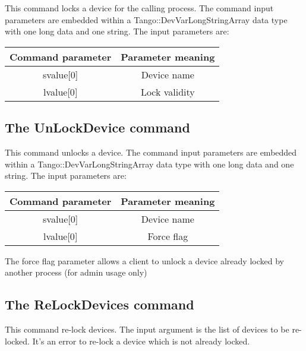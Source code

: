 This command locks a device for the calling process. The command input
parameters are embedded within a Tango::DevVarLongStringArray data
type with one long data and one string. The input parameters are:\vspace{0.3cm}


\begin{center}
\begin{longtable}{|c|c|}
\hline 
Command parameter & Parameter meaning\tabularnewline
\hline 
\hline 
svalue{[}0{]} & Device name\tabularnewline
\hline 
lvalue{[}0{]} & Lock validity\tabularnewline
\hline 
\end{longtable}
\par\end{center}

\vspace{0.3cm}



\subsection{The UnLockDevice command}

This command unlocks a device. The command input parameters are embedded
within a Tango::DevVarLongStringArray data type with one long data
and one string. The input parameters are:\vspace{0.3cm}


\begin{center}
\begin{longtable}{|c|c|}
\hline 
Command parameter & Parameter meaning\tabularnewline
\hline 
\hline 
svalue{[}0{]} & Device name\tabularnewline
\hline 
lvalue{[}0{]} & Force flag\tabularnewline
\hline 
\end{longtable}
\par\end{center}

\vspace{0.3cm}


The force flag parameter allows a client to unlock a device already
locked by another process (for admin usage only)


\subsection{The ReLockDevices command}

This command re-lock devices. The input argument is the list of devices
to be re-locked. It's an error to re-lock a device which is not already
locked.


